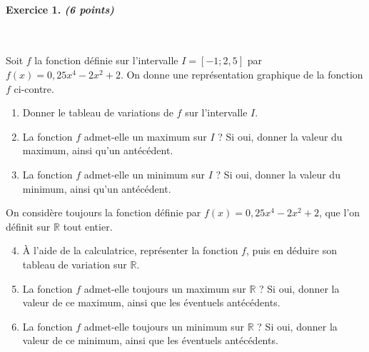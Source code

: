 \documentclass[11pt]{article}
\begin{document}
\paragraph{Exercice 1. \emph{(6 points)}}~\\
\begin{minipage}{.6\textwidth}
  Soit $f$ la fonction définie sur l'intervalle $I=[-1; 2,5]$ par
  $f(x)=0,25x^4-2x^2+2$. On donne une représentation graphique de la fonction
  $f$ ci-contre.
  \begin{enumerate}[leftmargin=*]
    \item Donner le tableau de variations de $f$ sur l'intervalle $I$.
    \item La fonction $f$ admet-elle un maximum sur $I$ ? Si oui, donner la
      valeur du maximum, ainsi qu'un antécédent.
    \item La fonction $f$ admet-elle un minimum sur $I$ ? Si oui, donner la
      valeur du minimum, ainsi qu'un antécédent.
  \end{enumerate}
\end{minipage}
\begin{minipage}{.4\textwidth}
  \begin{center}
  \end{center}
\end{minipage}
On considère toujours la fonction définie par $f(x)=0,25x^4-2x^2+2$, que
l'on définit sur $\mathbb{R}$ tout entier.
\begin{enumerate}[leftmargin=*]
    \setcounter{enumi}{3}
  \item À l'aide de la calculatrice, représenter la fonction $f$, puis en
    déduire son tableau de variation sur $\mathbb{R}$.
  \item La fonction $f$ admet-elle toujours un maximum sur $\mathbb{R}$ ? Si
    oui, donner la valeur de ce maximum, ainsi que les éventuels antécédents.
  \item La fonction $f$ admet-elle toujours un minimum sur $\mathbb{R}$ ? Si
    oui, donner la valeur de ce minimum, ainsi que les éventuels antécédents.
\end{enumerate}
\end{document}
